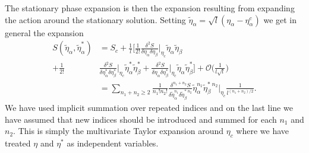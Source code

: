 The stationary phase expansion is then the expansion resulting from expanding the action around the stationary solution. Setting
$\tilde{\eta}_\alpha = \sqrt{l}(\eta_\alpha-\eta^c_\alpha)$ we get in general the expansion
\begin{equation}
    \label{eq:Field:Stat:stationaryPhaseExpansion}
    \begin{split}
        S(\tilde{\eta}_\alpha,\tilde{\eta}_\alpha^\ast) &= S_c + \frac{1}{l}\bigg[\frac{1}{2!}\frac{\delta^2S}{\delta\eta_\alpha\delta\eta_\beta}\Big|_{\eta_c}\tilde{\eta}_\alpha\tilde{\eta}_\beta\\
        + \frac{1}{2!}&\frac{\delta^2S}{\delta\eta_\alpha^\ast\delta\eta_\beta^\ast}\Big|_{\eta_c}\tilde{\eta}^\ast_\alpha\tilde{\eta}^\ast_\beta
        + \frac{\delta^2S}{\delta\eta_\alpha\delta\eta_\beta^\ast}\Big|_{\eta_c}\tilde{\eta}_\alpha\tilde{\eta}_\beta^\ast\bigg] +  \mathcal{O}\Big(\frac{1}{l\sqrt{l}}\Big)\\
        &= \sum_{n_1+n_2\geq 2}\frac{1}{n_1!n_2!}\frac{\delta^{n_1+n_2}S}{\delta\tilde{\eta}_\alpha^{n_1}\delta\tilde{\eta}_\beta^{\ast\;n_2}}\tilde{\eta}_\alpha^{n_1}\tilde{\eta}_\beta^{\ast\;n_2}\Big|_{\eta_c}\frac{1}{l^{(n_1+n_2)/2}}.
    \end{split}
\end{equation}
We have used implicit summation over repeated indices and on the last line we have assumed that new indices should be introduced and summed for each $n_1$ and $n_2$.
This is simply the multivariate Taylor expansion around $\eta_c$ where we have treated $\eta$ and $\eta^\ast$ as independent variables.

